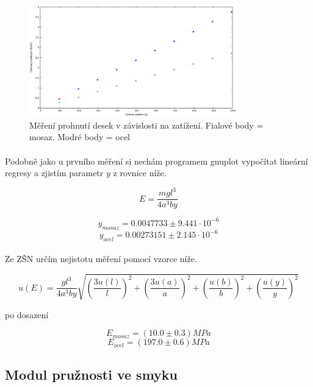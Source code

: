 \documentclass[a4paper,11pt]{article}
\begin{document}
        \begin{figure}[h]
            \centering
            \includegraphics[width=0.8\textwidth]{mereni2.png}
            \caption{Měření prohnutí desek v závislosti na zatížení. Fialové body = mosaz. 
                Modré body = ocel}
            \label{fig:mereni2}
        \end{figure}

        \paragraph{} Podobně jako u prvního měření si nechám programem gnuplot vypočítat
            lineární regresy a zjistím parametr $y$ z rovnice níže.

        \begin{equation}
            E = \frac{m g l^{3}}{4 a^{3} b y}
        \end{equation}

        $$y_{mosaz} = 0.0047733 \pm 9.441 \cdot 10 ^{-6}$$
        $$y_{ocel} = 0.00273151 \pm 2.145 \cdot 10 ^{-6}$$

        \paragraph{} Ze ZŠN určím nejistotu měření pomocí vzorce níže.

        \begin{equation}
            u(E) = \frac{g l^{3}}{4 a^{3} b y} \sqrt{\left( \frac{3u(l)}{l} \right) ^{2} 
                + \left( \frac{ 3 u(a)}{a} \right) ^{2}
                + \left( \frac{u(b)}{b} \right) ^{2} 
                + \left( \frac{u(y)}{y} \right) ^{2} }
        \end{equation}

        po dosazení

        $$E_{mosaz} = (10.0 \pm 0.3) MPa$$
        $$E_{ocel} = (197.0 \pm 0.6) MPa$$

    \subsection{Modul pružnosti ve smyku}
\end{document}
